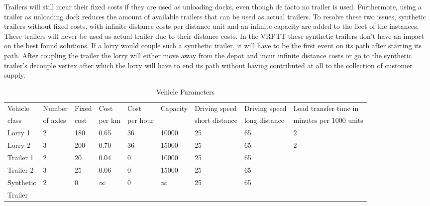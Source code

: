 






 Trailers will still incur their fixed costs if they are used as unloading docks, even though de facto no trailer is used. Furthermore, using a trailer as unloading dock reduces the amount of available trailers that can be used as actual trailers.
 To resolve these two issues, synthetic trailers without fixed costs, with infinite distance costs per distance unit and an infinite capacity are added to the fleet of the instances.
These trailers will never be used as actual trailer due to their distance costs.
In the VRPTT these synthetic trailers don't have an impact on the best found solutions.
If a lorry would couple such a synthetic trailer, it will have to be the first event on its path after starting its path.
After coupling the trailer the lorry will either move away from the depot and incur infinite distance costs or go to the synthetic trailer's decouple vertex after which the lorry will have to end its path without having contributed at all to the collection of customer supply. \\




\begin{table}[h]
\caption{Vehicle Parameters}
\label{tab:vehpar}
\hspace*{-3.5cm}\begin{tabular}{lllllllll}
\toprule
Vehicle  & Number  & Fixed  &  Cost  &  Cost  &  Capacity &  Driving speed & Driving speed  & Load transfer time in  \\
 class & of axles & cost &   per km &   per hour &   &  short distance & long distance & minutes per 1000 units \\
 \midrule
Lorry 1 &2 &180 &0.65 &36 &10000& 25 &65 &2 \\
Lorry 2 &3 &200& 0.70& 36& 15000& 25 &65 &2\\
Trailer 1 &2& 20& 0.04& 0 &10000 &25 &65 &\\
Trailer 2 &3 &25 &0.06 &0 &15000& 25& 65 &\\
Synthetic & 2 & 0 & $\infty$ & 0 & $\infty$ & 25 & 65 & \\
Trailer & & & & &&& &\\
\bottomrule
\end{tabular}
\end{table}


